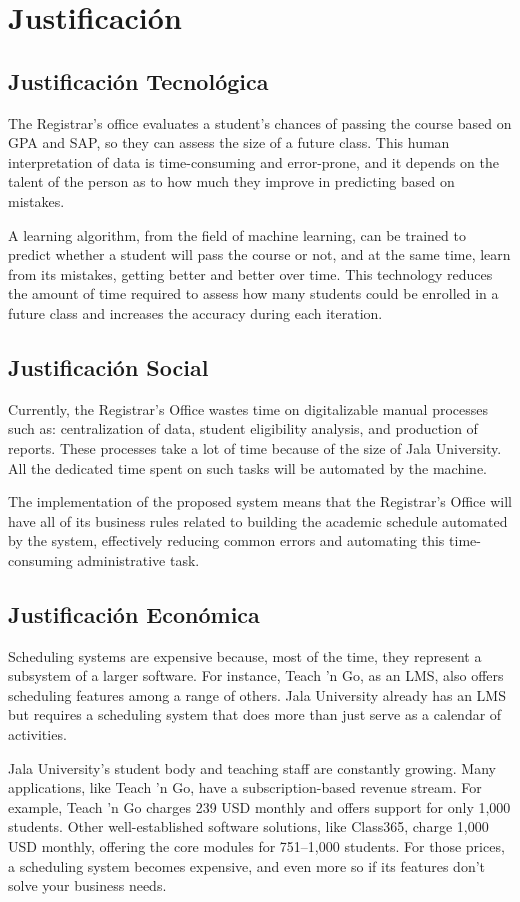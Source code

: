 \section{Justificación}

\subsection{Justificación Tecnológica}
The Registrar's office evaluates a student's chances of passing the course based on GPA and SAP, so they can assess the size of a future class. This human interpretation of data is time-consuming and error-prone, and it depends on the talent of the person as to how much they improve in predicting based on mistakes.

A learning algorithm, from the field of machine learning, can be trained to predict whether a student will pass the course or not, and at the same time, learn from its mistakes, getting better and better over time. This technology reduces the amount of time required to assess how many students could be enrolled in a future class and increases the accuracy during each iteration.

\subsection{Justificación Social}

Currently, the Registrar's Office wastes time on digitalizable manual processes such as: centralization of data, student eligibility analysis, and production of reports. These processes take a lot of time because of the size of Jala University. All the dedicated time spent on such tasks will be automated by the machine.

The implementation of the proposed system means that the Registrar's Office will have all of its business rules related to building the academic schedule automated by the system, effectively reducing common errors and automating this time-consuming administrative task.

\subsection{Justificación Económica}
Scheduling systems are expensive because, most of the time, they represent a subsystem of a larger software. For instance, Teach 'n Go, as an LMS, also offers scheduling features among a range of others. Jala University already has an LMS but requires a scheduling system that does more than just serve as a calendar of activities.

Jala University's student body and teaching staff are constantly growing. Many applications, like Teach 'n Go, have a subscription-based revenue stream. For example, Teach 'n Go charges 239 USD monthly and offers support for only 1,000 students. Other well-established software solutions, like Class365, charge 1,000 USD monthly, offering the core modules for 751–1,000 students. For those prices, a scheduling system becomes expensive, and even more so if its features don't solve your business needs.

